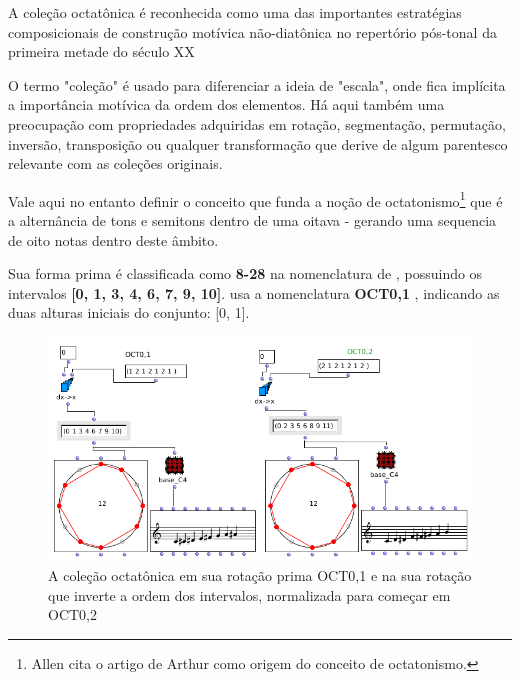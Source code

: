 \documentclass[
	12pt,				%
	openright,			%
	twoside,			%
	a4paper,			%
	english,			%
	french,				%
	spanish,			%
	brazil				%
	]{abntex2}
\begin{document}
A coleção octatônica é reconhecida como uma das importantes estratégias composicionais de construção motívica não-diatônica no repertório pós-tonal da primeira metade do século XX \cite{berger1963problems,antokoletz1984music,lester1989analytic,forte1991debussy,straus2004,de2013simetria}

O termo "coleção" é usado para diferenciar a ideia de "escala", onde fica implícita a importância motívica da ordem dos elementos. Há aqui também uma preocupação com propriedades adquiridas em rotação, segmentação, permutação, inversão, transposição ou qualquer transformação que derive de algum parentesco relevante com as coleções originais.

Vale aqui no entanto definir o conceito que funda a noção de octatonismo\footnote{Allen  cita o artigo de Arthur  como origem do conceito de octatonismo.} que é a alternância de tons e semitons dentro de uma oitava - gerando uma sequencia de oito notas dentro deste âmbito. 

Sua forma prima é classificada como\textbf{ 8-28} na nomenclatura de , possuindo os intervalos \textbf{[0, 1, 3, 4, 6, 7, 9, 10]}.  usa a nomenclatura  \textbf{OCT0,1 }, indicando as duas alturas iniciais do conjunto: [0, 1].

\begin{figure}[!h]
	\caption{\label{fig_grafico} A coleção octatônica em sua rotação prima OCT0,1 e na sua rotação que inverte a ordem dos intervalos, normalizada para começar em OCT0,2}
	\begin{center}
	    \includegraphics[scale=0.5]{octa/octaOM.png}
	\end{center}
\end{figure}
\end{document}
